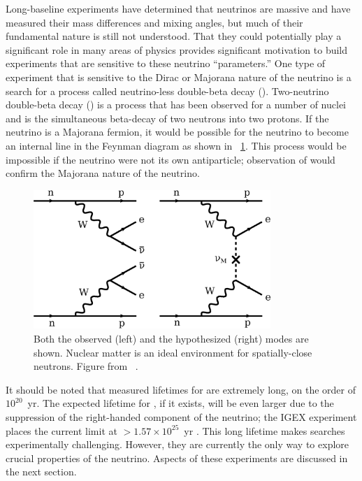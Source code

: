 Long-baseline experiments have determined that neutrinos are massive and have measured their mass differences and mixing angles, but much of their fundamental nature is still not understood.  That they could potentially play a significant role in many areas of physics provides significant motivation to build experiments that are sensitive to these neutrino ``parameters.'' One type of experiment that is sensitive to the Dirac or Majorana nature of the neutrino is a search for a process called neutrino-less double-beta decay (\zvbb).  Two-neutrino double-beta decay (\tvbb) is a process that has been observed for a number of nuclei and is the simultaneous beta-decay of two neutrons into two protons.  If the neutrino is a Majorana fermion, it would be possible for the neutrino to become an internal line in the Feynman diagram as shown in {\fig}~\ref{fig:zvbb}.  This process would be impossible if the neutrino were not its own antiparticle; observation of \zvbb would confirm the Majorana nature of the neutrino. 
\begin{figure}[htp]
\centering
\includegraphics[width=0.8\textwidth]{figures/feynman2.eps}
\caption[Feynman diagrams describing \tvbb and \zvbb.]{Both the observed \tvbb (left) and the hypothesized \zvbb (right) modes are shown.  Nuclear matter is an ideal environment for spatially-close neutrons.  Figure from {}~\citep{zvbbReview_Elliott}.}
\label{fig:zvbb}
\end{figure}
It should be noted that measured lifetimes for \tvbb are extremely long, on the order of $10^{20}$~yr.  The expected lifetime for \zvbb, if it exists, will be even larger due to the suppression of the right-handed component of the neutrino; the IGEX experiment places the current limit at $>1.57\times 10^{25}$~yr \citep{IGEX}.  This long lifetime makes \zvbb searches experimentally challenging.  However, they are currently the only way to explore crucial properties of the neutrino.  Aspects of these experiments are discussed in the next section.

